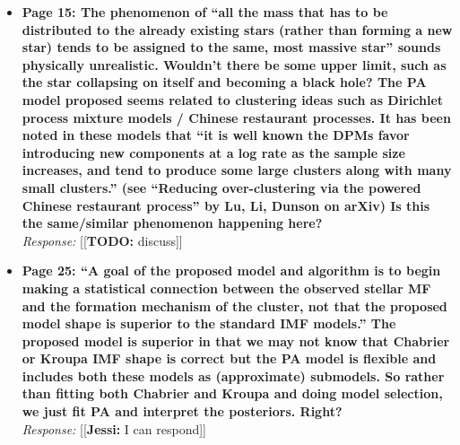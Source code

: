\documentclass[11pt, oneside]{article}   	%
\newcommand{\jessi}[1]{{\color{blue}[[\textbf{Jessi: }#1]]}}
\newcommand{\todo}[1]{{\color{red}[[\textbf{TODO: }#1]]}}
\begin{document}
\begin{itemize}
\item {\bf Page 15: The phenomenon of ``all the mass that has to be distributed to the already existing stars (rather than forming a new star) tends to be assigned to the same, most massive star'' sounds physically unrealistic. Wouldn't there be some upper limit, such as the star collapsing on itself and becoming a black hole? The PA model proposed seems related to clustering ideas such as Dirichlet process mixture models / Chinese
restaurant processes. It has been noted in these models that ``it is well known the DPMs favor introducing new components at a log rate as the sample size increases, and tend to produce some large clusters along with many small clusters.'' (see ``Reducing over-clustering via the powered Chinese restaurant process'' by Lu, Li, Dunson on arXiv) Is this the same/similar phenomenon happening here?
} \\
\noindent \emph{Response:} \todo{discuss}
\bigskip

\item {\bf Page 25: ``A goal of the proposed model and algorithm is to begin making a statistical connection between the observed stellar MF and the formation mechanism of the cluster, not that the proposed model shape is superior to the standard IMF models.'' The proposed model is superior in that we may not know that Chabrier or Kroupa IMF shape is correct but the PA model is flexible and includes both these models as (approximate) submodels. So rather than fitting both Chabrier and Kroupa and doing model selection, we just fit PA and interpret the posteriors. Right?} \\
\noindent \emph{Response:} \jessi{I can respond}
\bigskip
\end{itemize}


\\
\end{document}
